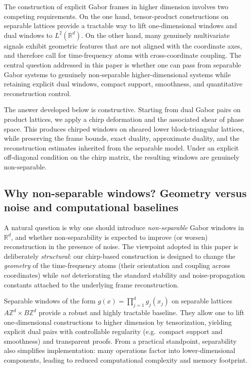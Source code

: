 \documentclass[final,1p,times,authoryear]{elsarticle}
\theoremstyle{definition}
\newcommand{\R}{\mathbb{R}}
\newcommand{\Z}{\mathbb{Z}}
\newcommand{\1}{\mathbf{1}}
\begin{document}
The construction of explicit Gabor frames in higher dimension involves two competing requirements.
On the one hand, tensor-product constructions on separable lattices provide a tractable way to lift
one-dimensional windows and dual windows to $L^2(\R^d)$. On the other hand, many genuinely
multivariate signals exhibit geometric features that are not aligned with the coordinate axes, and
therefore call for time-frequency atoms with cross-coordinate coupling. The central question addressed
in this paper is whether one can pass from separable Gabor systems to genuinely non-separable
higher-dimensional systems while retaining explicit dual windows, compact support, smoothness, and
quantitative reconstruction control.

{The answer developed below is constructive. Starting from dual Gabor pairs on product lattices, we
apply a chirp deformation and the associated shear of phase space. This produces chirped windows
on sheared lower block-triangular lattices, while preserving the frame bounds, exact duality,
approximate duality, and the reconstruction estimates inherited from the separable model.
Under an explicit off-diagonal condition on the chirp matrix, the resulting windows are genuinely
non-separable.}

\subsection{Why non-separable windows? Geometry versus noise and computational baselines}\label{subsec:why_nonseparable}

A natural question is why one should introduce \emph{non-separable} Gabor windows in $\R^d$, and whether
non-separability is expected to improve (or worsen) reconstruction in the presence of noise.
The viewpoint adopted in this paper is deliberately \emph{structural}: our chirp-based construction is
designed to change the \emph{geometry} of the time-frequency atoms (their orientation and coupling across
coordinates) while \emph{not} deteriorating the standard stability and noise-propagation constants
attached to the underlying frame reconstruction.

Separable windows of the form $g(x)=\prod_{j=1}^d g_j(x_j)$ on separable lattices
$A\Z^d\times B\Z^d$ provide a robust and highly tractable baseline.
They allow one to lift one-dimensional constructions to higher dimension by tensorization, yielding explicit
dual pairs with controllable regularity (e.g.\ compact support and smoothness) and transparent proofs.
From a practical standpoint, separability also simplifies implementation: many operations factor into
lower-dimensional components, leading to reduced computational complexity and memory footprint.
\end{document}
